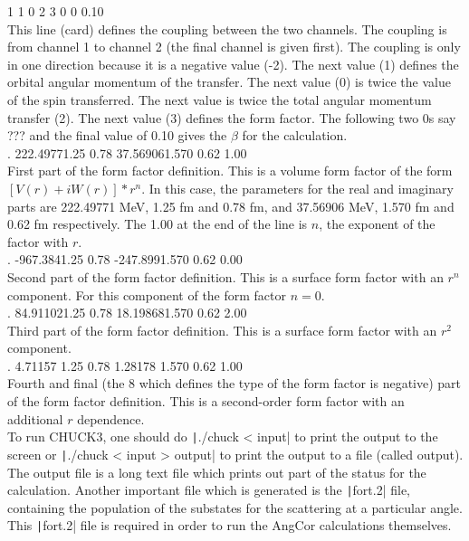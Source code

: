 \documentclass[a4paper,10pt]{article}
\begin{document}
  1  1  0  2  3  0  0 0.10\\
This line (card) defines the coupling between the two channels. The coupling is from channel 1 to channel 2 (the final channel is given first). The coupling is only in one direction because it is a negative value (-2). The next value (1) defines the orbital angular momentum of the transfer. The next value (0) is twice the value of the spin transferred. The next value is twice the total angular momentum transfer (2). The next value (3) defines the form factor. The following two 0s say ??? and the final value of 0.10 gives the $\beta$ for the calculation. \\
 
.      222.49771.25    0.78            37.569061.570   0.62            1.00\\
First part of the form factor definition. This is a volume form factor of the form $[V(r) + iW(r)] * r^n$. In this case, the parameters for the real and imaginary parts are 222.49771 MeV, 1.25 fm and 0.78 fm, and 37.56906 MeV, 1.570 fm and 0.62 fm respectively. The 1.00 at the end of the line is $n$, the exponent of the factor with $r$.\\

.      -967.3841.25    0.78            -247.8991.570   0.62            0.00\\
Second part of the form factor definition. This is a surface form factor with an $r^n$ component. For this component of the form factor $n=0$.\\

.      84.911021.25    0.78            18.198681.570   0.62            2.00\\
Third part of the form factor definition. This is a surface form factor with an $r^2$ component.\\

.     4.71157 1.25    0.78            1.28178 1.570   0.62            1.00\\
Fourth and final (the 8 which defines the type of the form factor is negative) part of the form factor definition. This is a second-order form factor with an additional $r$ dependence.\\

To run CHUCK3, one should do \texttt|./chuck < input| to print the output to the screen or \texttt|./chuck < input > output| to print the output to a file (called output). The output file is a long text file which prints out part of the status for the calculation. Another important file which is generated is the \texttt|fort.2| file, containing the population of the substates for the scattering at a particular angle. This \texttt|fort.2| file is required in order to run the AngCor calculations themselves.
\end{document}
